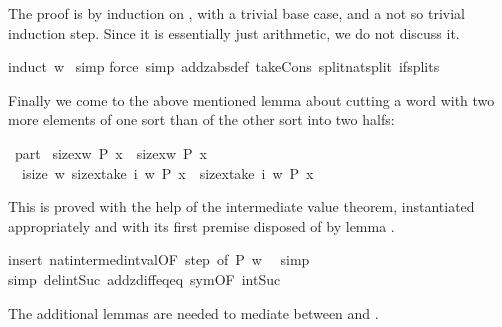 \begin{isabellebody}
\begin{isamarkuptxt}
The proof is by induction on , with a trivial base case, and a not
so trivial induction step. Since it is essentially just arithmetic, we do not
discuss it.%
\end{isamarkuptxt}%
induct\ w{\isacharparenright}\isanewline
\ simp{\isacharparenright}\isanewline
{}force\ simp\ add{\isacharcolon}zabs{\isacharunderscore}def\ take{\isacharunderscore}Cons\ split{\isacharcolon}nat{\isachardot}split\ if{\isacharunderscore}splits{\isacharparenright}%
\begin{isamarkuptext}%
Finally we come to the above mentioned lemma about cutting a word with two
more elements of one sort than of the other sort into two halfs:%
\end{isamarkuptext}%
\ part{}{\isacharcolon}\isanewline
\ {\isachardoublequote}size{\isacharbrackleft}x{\isasymin}w{\isachardot}\ P\ x{\isacharbrackright}\ {\isacharequal}\ size{\isacharbrackleft}x{\isasymin}w{\isachardot}\ {\isasymnot}P\ x{\isacharbrackright}{\isacharplus}{}\ {\isasymLongrightarrow}\isanewline
\ \ {\isasymexists}i{\isasymle}size\ w{\isachardot}\ size{\isacharbrackleft}x{\isasymin}take\ i\ w{\isachardot}\ P\ x{\isacharbrackright}\ {\isacharequal}\ size{\isacharbrackleft}x{\isasymin}take\ i\ w{\isachardot}\ {\isasymnot}P\ x{\isacharbrackright}{\isacharplus}{}{\isachardoublequote}%
\begin{isamarkuptxt}%
\noindent
This is proved with the help of the intermediate value theorem, instantiated
appropriately and with its first premise disposed of by lemma
.%
\end{isamarkuptxt}%
insert\ nat{}{\isacharunderscore}intermed{\isacharunderscore}int{\isacharunderscore}val{\isacharbrackleft}OF\ step{}{\isacharcomma}\ of\ {\isachardoublequote}P{\isachardoublequote}\ {\isachardoublequote}w{\isachardoublequote}\ {\isachardoublequote}{\isacharhash}{}{\isachardoublequote}{\isacharbrackright}{\isacharparenright}\isanewline
{}\ simp\isanewline
{}simp\ del{\isacharcolon}int{\isacharunderscore}Suc\ add{\isacharcolon}zdiff{\isacharunderscore}eq{\isacharunderscore}eq\ sym{\isacharbrackleft}OF\ int{\isacharunderscore}Suc{\isacharbrackright}{\isacharparenright}%
\begin{isamarkuptext}%
\noindent
The additional lemmas are needed to mediate between  and .


\end{isamarkuptext}
\end{isabellebody}
